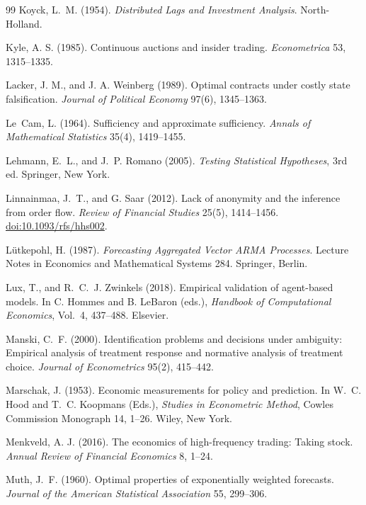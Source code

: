 \documentclass[12pt]{article}
\theoremstyle{definition}
\theoremstyle{remark}
\begin{document}
\begin{thebibliography}{99}
 Koyck, L.~M. (1954). \emph{Distributed Lags and Investment Analysis}. North-Holland.

 Kyle, A. S. (1985). Continuous auctions and insider trading. \emph{Econometrica} 53, 1315--1335.

 Lacker, J. M., and J. A. Weinberg (1989). Optimal contracts under costly state falsification. \emph{Journal of Political Economy} 97(6), 1345--1363.

 Le~Cam, L. (1964). Sufficiency and approximate sufficiency. \emph{Annals of Mathematical Statistics} 35(4), 1419--1455.

 Lehmann, E.~L., and J.~P. Romano (2005). \emph{Testing Statistical Hypotheses}, 3rd ed. Springer, New York.

 Linnainmaa, J.~T., and G. Saar (2012). Lack of anonymity and the inference from order flow. \emph{Review of Financial Studies} 25(5), 1414--1456. \href{https://doi.org/10.1093/rfs/hhs002}{doi:10.1093/rfs/hhs002}.

 L\"utkepohl, H. (1987). \emph{Forecasting Aggregated Vector ARMA Processes}. Lecture Notes in Economics and Mathematical Systems 284. Springer, Berlin.

 Lux, T., and R.~C.~J. Zwinkels (2018). Empirical validation of agent-based models. In C. Hommes and B. LeBaron (eds.), \emph{Handbook of Computational Economics}, Vol.~4, 437--488. Elsevier.

 Manski, C.~F. (2000). Identification problems and decisions under ambiguity: Empirical analysis of treatment response and normative analysis of treatment choice. \emph{Journal of Econometrics} 95(2), 415--442.

 Marschak, J. (1953). Economic measurements for policy and prediction. In W.~C. Hood and T.~C. Koopmans (Eds.), \emph{Studies in Econometric Method}, Cowles Commission Monograph 14, 1--26. Wiley, New York.

 Menkveld, A. J. (2016). The economics of high-frequency trading: Taking stock. \emph{Annual Review of Financial Economics} 8, 1--24.

 Muth, J.~F. (1960). Optimal properties of exponentially weighted forecasts. \emph{Journal of the American Statistical Association} 55, 299--306.


\end{thebibliography}
\end{document}
